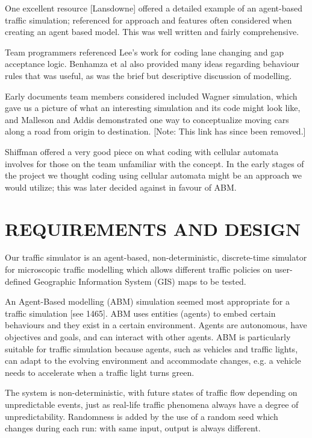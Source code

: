 \documentclass[11pt]{article}
\begin{document}
One excellent resource [Lansdowne\cite{4d}] offered a detailed example of an agent-based traffic simulation; referenced for approach and features often considered when creating an agent based model. This was well written and fairly comprehensive. 

Team programmers referenced Lee\textquoteright s\cite{8h} work for coding lane changing and gap acceptance logic. Benhamza et al\cite{6f} also provided many ideas regarding behaviour rules that was useful, as was the brief but descriptive discussion of modelling. 

Early documents team members considered included Wagner\cite{1a} simulation, which gave us a picture of what an interesting simulation and its code might look like, and Malleson and Addis\cite{3c} demonstrated one way to conceptualize moving cars along a road from origin to destination. [Note: This link has since been removed.] 

Shiffman \cite{2b} offered a very good piece on what coding with cellular automata involves for those on the team unfamiliar with the concept. In the early stages of the project we thought coding using cellular automata might be an approach we would utilize; this was later decided against in favour of ABM. 



\section{REQUIREMENTS AND DESIGN}


Our traffic simulator is an agent-based, non-deterministic, discrete-time simulator for microscopic traffic modelling which allows different traffic policies on user-defined Geographic Information System (GIS) maps to be tested. 

An Agent-Based modelling (ABM) simulation seemed most appropriate for a traffic simulation\cite{5e} [see 1465]. ABM uses entities (agents) to embed certain behaviours and they exist in a certain environment. Agents are autonomous, have objectives and goals, and can interact with other agents. ABM is particularly suitable for traffic simulation because agents, such as vehicles and traffic lights, can adapt to the evolving environment and accommodate changes, e.g. a vehicle needs to accelerate when a traffic light turns green.

The system is non-deterministic, with future states of traffic flow depending on unpredictable events, just as real-life traffic phenomena always have a degree of unpredictability. Randomness is added by the use of a random seed which changes during each run: with same input, output is always different. 
\end{document}
